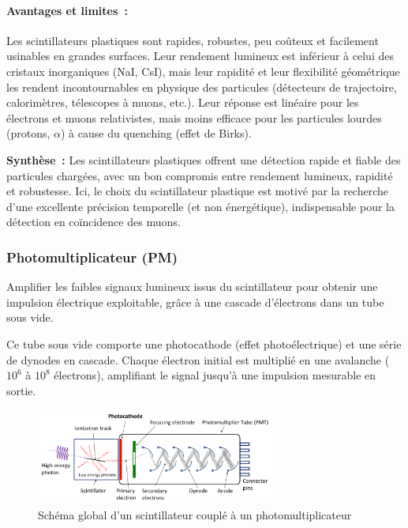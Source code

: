 \documentclass[a4paper,12pt,twoside]{article}
\begin{document}
\paragraph{Avantages et limites~:} Les scintillateurs plastiques sont rapides, robustes, peu coûteux et facilement usinables en grandes surfaces. Leur rendement lumineux est inférieur à celui des cristaux inorganiques (NaI, CsI), mais leur rapidité et leur flexibilité géométrique les rendent incontournables en physique des particules (détecteurs de trajectoire, calorimètres, télescopes à muons, etc.). Leur réponse est linéaire pour les électrons et muons relativistes, mais moins efficace pour les particules lourdes (protons, $\alpha$) à cause du quenching (effet de Birks).


\begin{remarque}
\textbf{Synthèse~:} Les scintillateurs plastiques offrent une détection rapide et fiable des particules chargées, avec un bon compromis entre rendement lumineux, rapidité et robustesse. Ici, le choix du scintillateur plastique est motivé par la recherche d’une excellente précision temporelle (et non énergétique), indispensable pour la détection en coïncidence des muons.
\end{remarque}

\subsubsection*{Photomultiplicateur (PM)}


\vspace{1em}
\begin{center}
\begin{tcolorbox}[colback=blue!5!white, colframe=blue!60!black, title=Principe du photomultiplicateur (PM)]
Amplifier les faibles signaux lumineux issus du scintillateur pour obtenir une impulsion électrique exploitable, grâce à une cascade d’électrons dans un tube sous vide.
\end{tcolorbox}
\end{center}


Ce tube sous vide comporte une photocathode (effet photoélectrique) et une série de dynodes en cascade. Chaque électron initial est multiplié en une avalanche ($10^6$ à $10^8$ électrons), amplifiant le signal jusqu’à une impulsion mesurable en sortie.

\begin{figure}[H]
  \centering
  \includegraphics[width=0.7\textwidth]{Images/PhotoMultiplierTubeAndScintillator.png}
  \caption{Schéma global d’un scintillateur couplé à un photomultiplicateur}
  \label{fig:pm_scintillator}
\end{figure}
\end{document}

